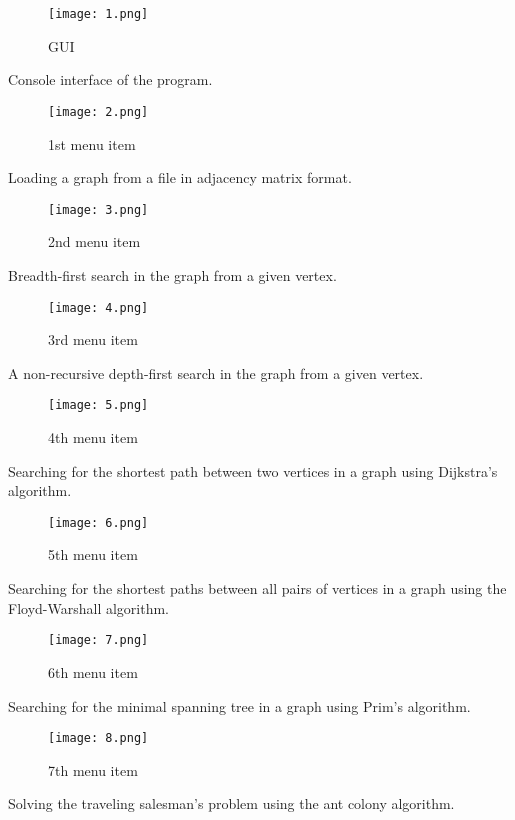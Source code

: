 \thispagestyle{plain}
\begin{center}
  \begin{figure}[h]
    \centering
    \texttt{[image: 1.png]}
    \caption{GUI}
  \end{figure}
  Console interface of the program.\\

  \begin{figure}[h]
    \centering
    \texttt{[image: 2.png]}
    \caption{1st menu item}
  \end{figure}
  Loading a graph from a file in adjacency matrix format.\\

\newpage

  \begin{figure}[h]
    \centering
    \texttt{[image: 3.png]}
    \caption{2nd menu item}
  \end{figure}
  Breadth-first search in the graph from a given vertex.\\

  \begin{figure}[h]
    \centering
    \texttt{[image: 4.png]}
    \caption{3rd menu item}
  \end{figure}
  A non-recursive depth-first search in the graph from a given vertex.\\

  \begin{figure}[h]
    \centering
    \texttt{[image: 5.png]}
    \caption{4th menu item}
  \end{figure}
  Searching for the shortest path between two vertices in a graph using Dijkstra's algorithm.\\

  \newpage

  \begin{figure}[h]
    \centering
    \texttt{[image: 6.png]}
    \caption{5th menu item}
  \end{figure}
  Searching for the shortest paths between all pairs of vertices in a graph using the Floyd-Warshall algorithm.\\

  \begin{figure}[h]
    \centering
    \texttt{[image: 7.png]}
    \caption{6th menu item}
  \end{figure}
  Searching for the minimal spanning tree in a graph using Prim's algorithm.\\

  \begin{figure}[h]
    \centering
    \texttt{[image: 8.png]}
    \caption{7th menu item}
  \end{figure}
  Solving the traveling salesman's problem using the ant colony algorithm.\\
\end{center}

